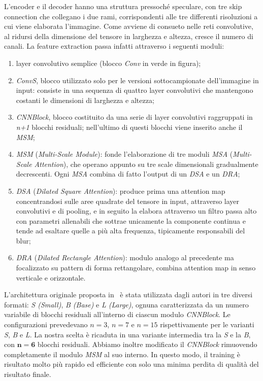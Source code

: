 \documentclass[a4paper,10pt,twocolumn]{article}
\begin{document}
L'encoder e il decoder hanno una struttura pressoché speculare, con tre skip connection che collegano i due rami, corrispondenti alle tre differenti risoluzioni a cui viene elaborata l'immagine. Come avviene di consueto nelle reti convolutive,
al ridursi della dimensione del tensore in larghezza e altezza, cresce il numero di canali. La feature extraction passa infatti attraverso i seguenti moduli:
\begin{enumerate}[label=\textbf{(\alph*)}]
    \item layer convolutivo semplice (blocco \textit{Conv} in verde in figura);
    \item \textit{ConvS}, blocco utilizzato solo per le versioni sottocampionate dell'immagine in input: consiste in una sequenza di quattro layer convolutivi che mantengono costanti le dimensioni di larghezza e altezza;
    \item \textit{CNNBlock}, blocco costituito da una serie di layer convolutivi raggruppati in \textit{n+1} blocchi residuali; nell'ultimo di questi blocchi viene inserito anche il \textit{MSM};
    \item \textit{MSM} (\textit{Multi-Scale Module}): fonde l'elaborazione di tre moduli \textit{MSA} (\textit{Multi-Scale Attention}), che operano appunto su tre scale dimensionali gradualmente decrescenti.
            Ogni \textit{MSA} combina di fatto l'output di un \textit{DSA} e un \textit{DRA};
    \item \textit{DSA} (\textit{Dilated Square Attention}): produce prima una attention map concentrandosi sulle aree quadrate del tensore in input, attraverso layer convolutivi e di pooling,
            e in seguito la elabora attraverso un filtro passa alto con parametri allenabili che sottrae unicamente la componente continua e tende ad esaltare quelle a più alta frequenza, 
            tipicamente responsabili del blur;
    \item \textit{DRA} (\textit{Dilated Rectangle Attention}): modulo analogo al precedente ma focalizzato su pattern di forma rettangolare, combina attention map in senso verticale e orizzontale.
\end{enumerate}

L'architettura originale proposta in~\cite{convir} è stata utilizzata dagli autori in tre diversi formati: \textit{S (Small)}, \textit{B (Base)} e \textit{L (Large)}, ognuna caratterizzata da un numero variabile di blocchi residuali all'interno di ciascun modulo \textit{CNNBlock}.
Le configurazioni prevedevano \(n=3\), \(n=7\) e \(n=15\) rispettivamente per le varianti \textit{S}, \textit{B} e \textit{L}. La nostra scelta è ricaduta in una variante intermedia tra la \textit{S} e la \textit{B}, con \(\mathbf{n=6}\) blocchi residuali.
Abbiamo inoltre modificato il \textit{CNNBlock} rimuovendo completamente il modulo \textit{MSM} al suo interno. In questo modo, il training è risultato molto più rapido ed efficiente con solo una minima perdita di qualità del risultato finale.
\end{document}

